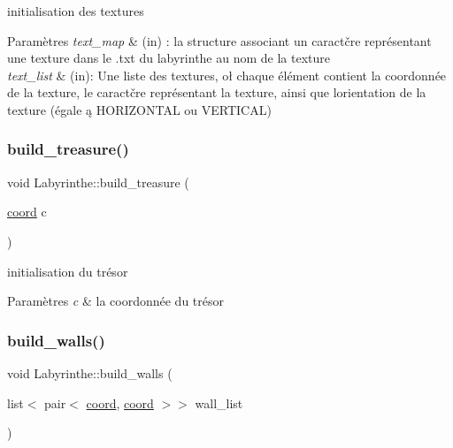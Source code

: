 initialisation des textures 


\begin{DoxyParams}{Paramètres}
{\em text\+\_\+map} & (in) \+: la structure associant un caractčre représentant une texture dans le .txt du labyrinthe au nom de la texture \\
\hline
{\em text\+\_\+list} & (in)\+: Une liste des textures, oł chaque élément contient la coordonnée de la texture, le caractčre représentant la texture, ainsi que l\textquotesingle{}orientation de la texture (égale ą H\+O\+R\+I\+Z\+O\+N\+T\+AL ou V\+E\+R\+T\+I\+C\+AL) \\
\hline
\end{DoxyParams}
\mbox{\label{classLabyrinthe_a2e30105a06c0512ea2078f825fae17bd}} 
\subsubsection{\texorpdfstring{build\+\_\+treasure()}{build\_treasure()}}
{\footnotesize\ttfamily void Labyrinthe\+::build\+\_\+treasure (\begin{DoxyParamCaption}\item[{\hyperlink{structcoord}{coord}}]{c }\end{DoxyParamCaption})\hspace{0.3cm}{\ttfamily [private]}}



initialisation du trésor 


\begin{DoxyParams}{Paramètres}
{\em c} & la coordonnée du trésor \\
\hline
\end{DoxyParams}
\mbox{\label{classLabyrinthe_a2694b6ca24a8bba34f590d645245ff7e}} 
\subsubsection{\texorpdfstring{build\+\_\+walls()}{build\_walls()}}
{\footnotesize\ttfamily void Labyrinthe\+::build\+\_\+walls (\begin{DoxyParamCaption}\item[{list$<$ pair$<$ \hyperlink{structcoord}{coord}, \hyperlink{structcoord}{coord} $>$$>$}]{wall\+\_\+list }\end{DoxyParamCaption})\hspace{0.3cm}{\ttfamily [private]}}



